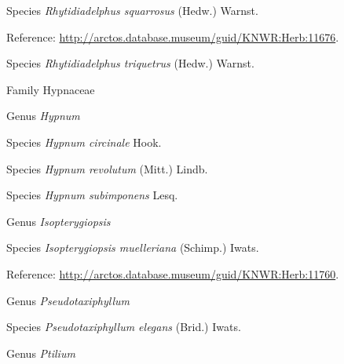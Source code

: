 \documentclass[9pt, article]{memoir}
\begin{document}
\begin{multicols}{2}
\vspace{6pt}\noindent\hspace{36pt}Species \textit{Rhytidiadelphus squarrosus} (Hedw.) Warnst.


\vspace{6pt}Reference: 
\url{http://arctos.database.museum/guid/KNWR:Herb:11676}.

\vspace{6pt}\noindent\hspace{36pt}Species \textit{Rhytidiadelphus triquetrus} (Hedw.) Warnst.


\vspace{6pt}\noindent\hspace{24pt}Family Hypnaceae


\vspace{6pt}\noindent\hspace{30pt}Genus \textit{Hypnum}


\vspace{6pt}\noindent\hspace{36pt}Species \textit{Hypnum circinale} Hook.


\vspace{6pt}\noindent\hspace{36pt}Species \textit{Hypnum revolutum} (Mitt.) Lindb.


\vspace{6pt}\noindent\hspace{36pt}Species \textit{Hypnum subimponens} Lesq.


\vspace{6pt}\noindent\hspace{30pt}Genus \textit{Isopterygiopsis}


\vspace{6pt}\noindent\hspace{36pt}Species \textit{Isopterygiopsis muelleriana} (Schimp.) Iwats.


\vspace{6pt}Reference: 
\url{http://arctos.database.museum/guid/KNWR:Herb:11760}.

\vspace{6pt}\noindent\hspace{30pt}Genus \textit{Pseudotaxiphyllum}


\vspace{6pt}\noindent\hspace{36pt}Species \textit{Pseudotaxiphyllum elegans} (Brid.) Iwats.


\vspace{6pt}\noindent\hspace{30pt}Genus \textit{Ptilium}



\end{multicols}
\end{document}
